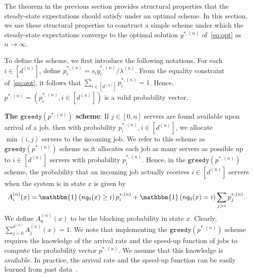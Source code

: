 \documentclass[a4paper]{article}
\def\ind{\mathbbm{1}}
\theoremstyle{plain}
\theoremstyle{definition}
\theoremstyle{case}
\theoremstyle{remark}
\newcommand{\brac}[1]{\left(#1\right)}
\newcommand{\abs}[1]{\lvert #1 \rvert}
\begin{document}
The theorem in the previous section provides structural properties that the steady-state expectations should satisfy under an optimal scheme. In this section, we use these structural properties to construct a simple scheme under which the steady-state expectations converge to the optimal solution $y^{*,(n)}$ of~\eqref{eq:opt} as $n \to \infty$. 

To define the scheme, we first introduce the following notations. 
For each $i \in [d^{(n)}]$, define $p_i^{*,(n)}=s_iy_i^{*,(n)}/\lambda^{(n)}$. From the equality constraint of~\eqref{eq:opt}, it follows that $\sum_{i \in [d^{(n)}]}p_i^{*,(n)}=1$. Hence, $p^{*,(n)}=(p_i^{*,(n)}, i \in [d^{(n)}])$ is a valid probability vector.


{\bf The $\texttt{greedy}(p^{*,(n)})$ scheme}: If $j \in [0,n]$ servers are found available upon arrival of a job, then with probability $p_i^{*,(n)}, i \in [d^{(n)}]$, we allocate $\min(i,j)$ servers to the incoming job. We refer to this scheme as $\texttt{greedy}(p^{*,(n)})$ scheme as it allocates each job as many servers as possible up to $i\in [d^{(n)}]$ servers with probability $p_i^{*,(n)}$. Hence, in the $\texttt{greedy}(p^{*,(n)})$ scheme, the probability that an incoming job actually receives $i \in [d^{(n)}]$ servers when the system is in state $x$ is given by 
\begin{equation} \label{eq: assign_prob_sub_k=n}
   A_i^{(n)}(x) = \ind \brac{nq_0(x) \geq i} p_i^{*,(n)}+ \ind \brac{nq_0(x) = i}\sum_{j >i} p_j^{*,(n)}. 
\end{equation}
%
We define $A_0^{(n)}(x)$ to be the blocking probability in state $x$. Clearly, $\sum_{j=0}^{d^{(n)}} A_j^{(n)}(x) = 1$. 
We note that implementing the $\texttt{greedy}(p^{*,(n)})$ scheme requires the knowledge of the arrival rate and the speed-up function of jobs to compute the probability vector $p^{*,(n)}$. We assume that this knowledge is available. In practice, the arrival rate and the speed-up function can be easily learned from past data~\cite{autopilot_google,mao2016resource}.
\end{document}
